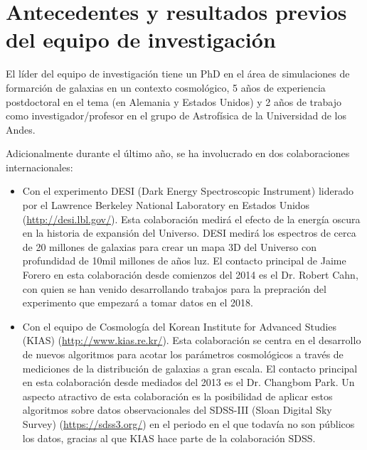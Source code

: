 \section{Antecedentes y resultados previos del equipo de
  investigaci\'on} 

El l\'ider del equipo de investigaci\'on tiene un PhD en el \'area de
simulaciones de formarci\'on de galaxias en un  contexto
cosmol\'ogico, 5 a\~nos de experiencia postdoctoral en el tema (en
Alemania y Estados Unidos) y 2 a\~nos de trabajo como
investigador/profesor en el grupo de  Astrof\'isica de la Universidad
de los Andes. 


Adicionalmente durante el \'ultimo a\~no, se ha involucrado en dos
colaboraciones internacionales: 

\begin{itemize}
\item Con el experimento DESI
(Dark Energy Spectroscopic Instrument) liderado por el Lawrence
Berkeley National Laboratory en Estados Unidos
(\url{http://desi.lbl.gov/}). 
Esta colaboraci\'on medir\'a el efecto
de la energ\'ia oscura en la historia de expansi\'on del
Universo. 
DESI medir\'a los espectros de cerca de 20 millones de galaxias
para crear un mapa 3D del Universo con  profundidad de 10mil
millones de a\~nos luz. 
El contacto principal de Jaime Forero en esta colaboraci\'on desde
comienzos del 2014 es el Dr. Robert Cahn, con quien se han venido
desarrollando trabajos para la prepraci\'on del experimento que
empezar\'a a tomar datos en el 2018. 

\item Con el equipo de Cosmolog\'ia del Korean Institute for Advanced
  Studies (KIAS) (\url{http://www.kias.re.kr/}). 
Esta colaboraci\'on se centra en el desarrollo de nuevos 
  algoritmos para acotar los par\'ametros cosmol\'ogicos a trav\'es de
  mediciones de la distribuci\'on de galaxias a gran escala. 
  El contacto principal en esta colaboraci\'on desde mediados del 2013 es
  el Dr. Changbom Park. 
  Un aspecto atractivo de esta colaboraci\'on es
  la posibilidad de aplicar estos algoritmos sobre datos observacionales del
  SDSS-III (Sloan Digital  Sky Survey) (\url{https://sdss3.org/}) en
  el periodo en el que todav\'ia no son p\'ublicos los  datos, gracias
  al que KIAS hace parte de la colaboraci\'on SDSS. 

\end{itemize}

